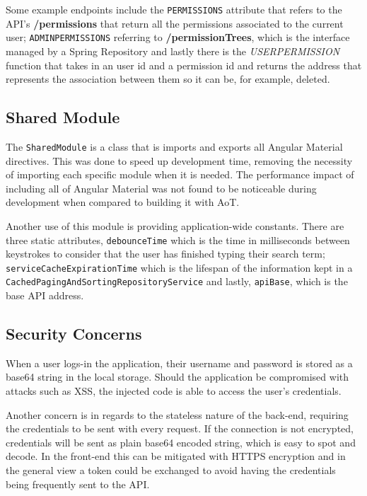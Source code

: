 Some example endpoints include the \texttt{PERMISSIONS} attribute that refers to the \gls{API}'s \textbf{/permissions} that return all the permissions associated to the current user; \texttt{ADMIN\textunderscore PERMISSIONS} referring to \textbf{/permissionTrees}, which is the interface managed by a Spring Repository and lastly there is the \textit{USER\textunderscore PERMISSION} function that takes in an user id and a permission id and returns the address that represents the association between them so it can be, for example, deleted.

\subsection{Shared Module}\label{shared}
The \texttt{SharedModule} is a class that is imports and exports all Angular Material directives. This was done to speed up development time, removing the necessity of importing each specific module when it is needed. The performance impact of including all of Angular Material was not found to be noticeable during development when compared to building it with \gls{AoT}.

Another use of this module is providing application-wide constants. There are three static attributes, \texttt{debounceTime} which is the time in milliseconds between keystrokes to consider that the user has finished typing their search term; \texttt{serviceCacheExpirationTime} which is the lifespan of the information kept in a \texttt{CachedPagingAndSortingRepositoryService} and lastly, \texttt{apiBase}, which is the base \gls{API} address.

\subsection{Security Concerns}\label{concerns}
When a user logs-in the application, their username and password is stored as a base64 string in the local storage. Should the application be compromised with attacks such as \gls{XSS}, the injected code is able to access the user's credentials.

Another concern is in regards to the stateless nature of the back-end, requiring the credentials to be sent with every request. If the connection is not encrypted, credentials will be sent as plain base64 encoded string, which is easy to spot and decode. In the front-end this can be mitigated with \gls{HTTPS} encryption and in the general view a token could be exchanged to avoid having the credentials being frequently sent to the \gls{API}.



